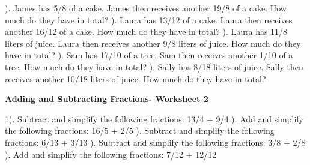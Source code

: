 \documentclass{article}%
\begin{document}
). James has 5/8 of a cake. James then receives another 19/8 of a cake. How much do they have in total?%
\newline%
\newline%
). Laura has 13/12 of a cake. Laura then receives another 16/12 of a cake. How much do they have in total?%
\newline%
\newline%
). Laura has 11/8 liters of juice. Laura then receives another 9/8 liters of juice. How much do they have in total?%
\newline%
\newline%
). Sam has 17/10 of a tree. Sam then receives another 1/10 of a tree. How much do they have in total?%
\newline%
\newline%
). Sally has 8/18 liters of juice. Sally then receives another 10/18 liters of juice. How much do they have in total?%
\newline%
\newline%
\newline%
\pagebreak%
\large%
\begin{center}%
\textbf{Adding and Subtracting Fractions- Worksheet 2}%
\newline%
\newline%
\newline%
\end{center} \normalsize%
1). Subtract and simplify the following fractions: 13/4 + 9/4%
\newline%
\newline%
). Add and simplify the following fractions: 16/5 + 2/5%
\newline%
\newline%
). Subtract and simplify the following fractions: 6/13 + 3/13%
\newline%
\newline%
). Subtract and simplify the following fractions: 3/8 + 2/8%
\newline%
\newline%
). Add and simplify the following fractions: 7/12 + 12/12%
\end{document}
